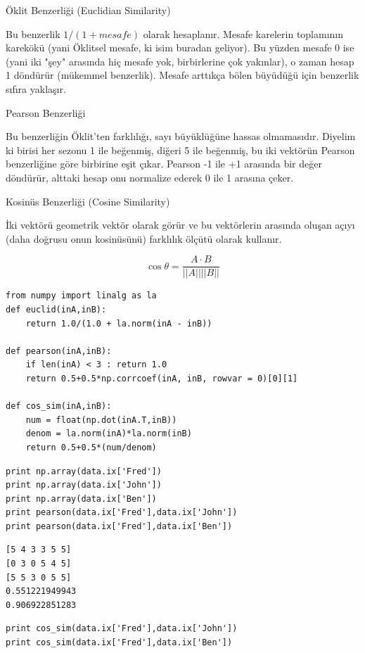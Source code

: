 \documentclass[12pt,fleqn]{article}\usepackage{../../common}
\begin{document}
Öklit Benzerliği (Euclidian Similarity)

Bu benzerlik $1 / (1+mesafe)$ olarak hesaplanır. Mesafe karelerin
toplamının karekökü (yani Öklitsel mesafe, ki isim buradan
geliyor). Bu yüzden mesafe 0 ise (yani iki "şey" arasında hiç mesafe
yok, birbirlerine çok yakınlar), o zaman hesap 1 döndürür (mükemmel
benzerlik). Mesafe arttıkça bölen büyüdüğü için benzerlik sıfıra yaklaşır. 

Pearson Benzerliği

Bu benzerliğin Öklit'ten farklılığı, sayı büyüklüğüne hassas olmamasıdır.
Diyelim ki birisi her sezonu 1 ile beğenmiş, diğeri 5 ile beğenmiş, bu iki
vektörün Pearson benzerliğine göre birbirine eşit çıkar. Pearson -1 ile +1
arasında bir değer döndürür, alttaki hesap onu normalize ederek 0 ile 1 arasına
çeker.

Kosinüs Benzerliği (Cosine Similarity)

İki vektörü geometrik vektör olarak görür ve bu vektörlerin arasında
oluşan açıyı (daha doğrusu onun kosinüsünü) farklılık ölçütü olarak
kullanır.

$$
\cos\theta = \frac{A \cdot B}{||A||||B||}
$$

\begin{verbatim}
from numpy import linalg as la
def euclid(inA,inB):
    return 1.0/(1.0 + la.norm(inA - inB))

def pearson(inA,inB):
    if len(inA) < 3 : return 1.0
    return 0.5+0.5*np.corrcoef(inA, inB, rowvar = 0)[0][1]

def cos_sim(inA,inB):
    num = float(np.dot(inA.T,inB))
    denom = la.norm(inA)*la.norm(inB)
    return 0.5+0.5*(num/denom)
\end{verbatim}

\begin{verbatim}
print np.array(data.ix['Fred'])
print np.array(data.ix['John'])
print np.array(data.ix['Ben'])
print pearson(data.ix['Fred'],data.ix['John'])
print pearson(data.ix['Fred'],data.ix['Ben'])
\end{verbatim}

\begin{verbatim}
[5 4 3 3 5 5]
[0 3 0 5 4 5]
[5 5 3 0 5 5]
0.551221949943
0.906922851283
\end{verbatim}

\begin{verbatim}
print cos_sim(data.ix['Fred'],data.ix['John'])
print cos_sim(data.ix['Fred'],data.ix['Ben'])
\end{verbatim}
\end{document}
